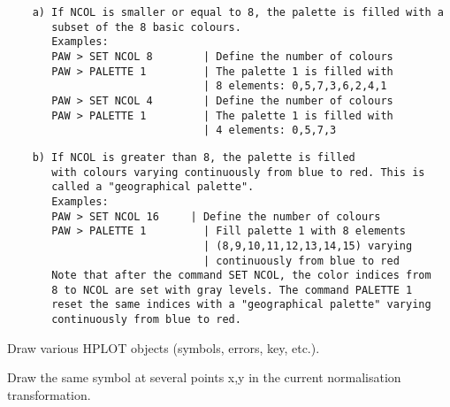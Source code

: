 \begin{verbatim}
    a) If NCOL is smaller or equal to 8, the palette is filled with a
       subset of the 8 basic colours.
       Examples:
       PAW > SET NCOL 8        | Define the number of colours
       PAW > PALETTE 1         | The palette 1 is filled with
                               | 8 elements: 0,5,7,3,6,2,4,1
       PAW > SET NCOL 4        | Define the number of colours
       PAW > PALETTE 1         | The palette 1 is filled with
                               | 4 elements: 0,5,7,3
\end{verbatim}
\begin{verbatim}
    b) If NCOL is greater than 8, the palette is filled
       with colours varying continuously from blue to red. This is
       called a "geographical palette".
       Examples:
       PAW > SET NCOL 16     | Define the number of colours
       PAW > PALETTE 1         | Fill palette 1 with 8 elements
                               | (8,9,10,11,12,13,14,15) varying
                               | continuously from blue to red
       Note that after the command SET NCOL, the color indices from
       8 to NCOL are set with gray levels. The command PALETTE 1
       reset the same indices with a "geographical palette" varying
       continuously from blue to red.
\end{verbatim}

\ENDCMD
{}
\ifMENUtext
   \par
Draw various HPLOT objects (symbols, errors, key, etc.).  


\fi


\BEGARG
{}
\ENDARG

   \par
Draw the same symbol at several points x,y in the current normalisation 
   transformation.  

\ENDCMD


